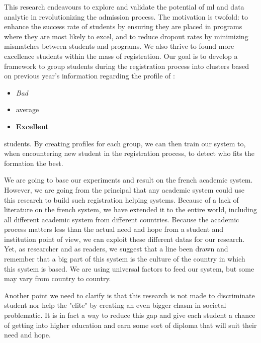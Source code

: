 \documentclass[../main.tex]{subfiles}
\begin{document}
This research endeavours to explore and validate the potential of \acrfull{ml} and data analytic in revolutionizing the admission process. The motivation is twofold: to enhance the success rate of students by ensuring they are placed in programs where they are most likely to excel, and to reduce dropout rates by minimizing mismatches between students and programs. We also thrive to found more excellence students within the mass of registration.
Our goal is to develop a framework to group students during the registration process into clusters based on previous year's information regarding the profile of :
\begin{itemize}
    \item \textit{Bad}
    \item average
    \item \textbf{Excellent}
\end{itemize}

students. By creating profiles for each group, we can then train our system to, when encountering new student in the registration process, to detect who fits the formation the best.

We are going to base our experiments and result on the french academic system. However, we are going from the principal that any academic system could use this research to build such registration helping systems. Because of a lack of literature on the french system, we have extended it to the entire world, including all different academic system from different countries. Because the academic process matters less than the actual need and hope from a student and institution point of view, we can exploit these different datas for our research. Yet, as researcher and as readers, we suggest that a line been drawn and remember that a big part of this system is the culture of the country in which this system is based. We are using universal factors to feed our system, but some may vary from country to country.

Another point we need to clarify is that this research is not made to discriminate student nor help the "elite" by creating an even bigger chasm in societal problematic. It is in fact a way to reduce this gap and give each student a chance of getting into higher education and earn some sort of diploma that will suit their need and hope.
\end{document}
